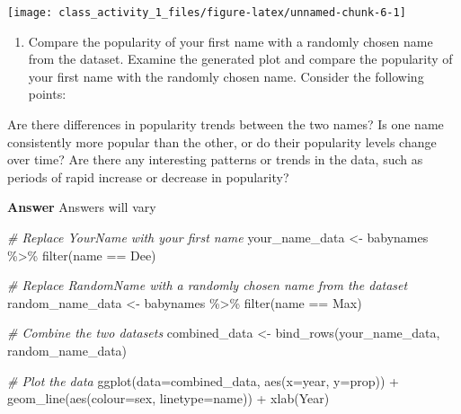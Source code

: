 \documentclass[
]{book}
\newenvironment{Shaded}{\begin{snugshade}}{\end{snugshade}}
\newcommand{\AttributeTok}[1]{\textcolor[rgb]{0.77,0.63,0.00}{#1}}
\newcommand{\CommentTok}[1]{\textcolor[rgb]{0.56,0.35,0.01}{\textit{#1}}}
\newcommand{\FunctionTok}[1]{\textcolor[rgb]{0.00,0.00,0.00}{#1}}
\newcommand{\NormalTok}[1]{#1}
\newcommand{\OtherTok}[1]{\textcolor[rgb]{0.56,0.35,0.01}{#1}}
\newcommand{\SpecialCharTok}[1]{\textcolor[rgb]{0.00,0.00,0.00}{#1}}
\newcommand{\StringTok}[1]{\textcolor[rgb]{0.31,0.60,0.02}{#1}}
\providecommand{\tightlist}{%
  \setlength{\itemsep}{0pt}\setlength{\parskip}{0pt}}
\begin{document}
\texttt{[image: class\_activity\_1\_files/figure-latex/unnamed-chunk-6-1]}

\begin{enumerate}
\def\labelenumi{\arabic{enumi}.}
\setcounter{enumi}{3}
\tightlist
\item
  Compare the popularity of your first name with a randomly chosen name from the dataset. Examine the generated plot and compare the popularity of your first name with the randomly chosen name. Consider the following points:
\end{enumerate}

Are there differences in popularity trends between the two names? Is one name consistently more popular than the other, or do their popularity levels change over time? Are there any interesting patterns or trends in the data, such as periods of rapid increase or decrease in popularity?

\textbf{Answer} Answers will vary

\vspace*{0.2in}

\begin{Shaded}
\begin{Highlighting}[]
\CommentTok{\# Replace \textquotesingle{}YourName\textquotesingle{} with your first name}
\NormalTok{your\_name\_data }\OtherTok{\textless{}{-}}\NormalTok{ babynames }\SpecialCharTok{\%\textgreater{}\%} \FunctionTok{filter}\NormalTok{(name }\SpecialCharTok{==} \StringTok{\textquotesingle{}Dee\textquotesingle{}}\NormalTok{)}

\CommentTok{\# Replace \textquotesingle{}RandomName\textquotesingle{} with a randomly chosen name from the dataset}
\NormalTok{random\_name\_data }\OtherTok{\textless{}{-}}\NormalTok{ babynames }\SpecialCharTok{\%\textgreater{}\%} \FunctionTok{filter}\NormalTok{(name }\SpecialCharTok{==} \StringTok{\textquotesingle{}Max\textquotesingle{}}\NormalTok{)}

\CommentTok{\# Combine the two datasets}
\NormalTok{combined\_data }\OtherTok{\textless{}{-}} \FunctionTok{bind\_rows}\NormalTok{(your\_name\_data, random\_name\_data)}

\CommentTok{\# Plot the data}
\FunctionTok{ggplot}\NormalTok{(}\AttributeTok{data=}\NormalTok{combined\_data, }\FunctionTok{aes}\NormalTok{(}\AttributeTok{x=}\NormalTok{year, }\AttributeTok{y=}\NormalTok{prop)) }\SpecialCharTok{+} 
  \FunctionTok{geom\_line}\NormalTok{(}\FunctionTok{aes}\NormalTok{(}\AttributeTok{colour=}\NormalTok{sex, }\AttributeTok{linetype=}\NormalTok{name)) }\SpecialCharTok{+} 
  \FunctionTok{xlab}\NormalTok{(}\StringTok{\textquotesingle{}Year\textquotesingle{}}\NormalTok{) }
\end{Highlighting}
\end{Shaded}
\end{document}
